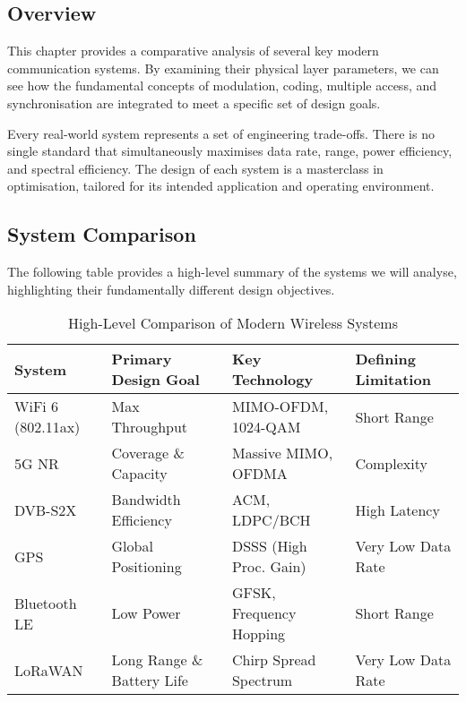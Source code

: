 \subsection{Overview}

This chapter provides a comparative analysis of several key modern communication systems. By examining their physical layer parameters, we can see how the fundamental concepts of modulation, coding, multiple access, and synchronisation are integrated to meet a specific set of design goals.

\begin{keyconcept}
    Every real-world system represents a set of engineering trade-offs. There is no single standard that simultaneously maximises data rate, range, power efficiency, and spectral efficiency. The design of each system is a masterclass in optimisation, tailored for its intended application and operating environment.
\end{keyconcept}


\subsection{System Comparison}

The following table provides a high-level summary of the systems we will analyse, highlighting their fundamentally different design objectives.

\begin{table}[H]
    \centering
    \caption{High-Level Comparison of Modern Wireless Systems}
    \label{tab:system-comparison}
    \begin{tabularx}{\textwidth}{@{}lXXX@{}}
        \toprule
        \tableheaderfont System & \tableheaderfont Primary Design Goal & \tableheaderfont Key Technology & \tableheaderfont Defining Limitation \\
        \midrule
        WiFi 6 (802.11ax) & Max Throughput & MIMO-OFDM, 1024-QAM & Short Range \\
        5G NR & Coverage \& Capacity & Massive MIMO, OFDMA & Complexity \\
        DVB-S2X & Bandwidth Efficiency & ACM, LDPC/BCH & High Latency \\
        GPS & Global Positioning & DSSS (High Proc. Gain) & Very Low Data Rate \\
        Bluetooth LE & Low Power & GFSK, Frequency Hopping & Short Range \\
        LoRaWAN & Long Range \& Battery Life & Chirp Spread Spectrum & Very Low Data Rate \\
        \bottomrule
    \end{tabularx}
\end{table}


